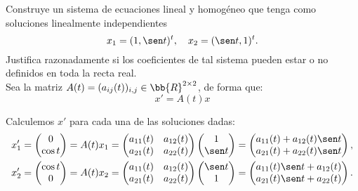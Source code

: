\begin{ejercicio}\label{ej:5.3}
    Construye un sistema de ecuaciones lineal y homogéneo que tenga como soluciones linealmente independientes
    \[
        x_1 = (1, \sen t)^t, \quad x_2 = (\sen t, 1)^t.
    \]
    Justifica razonadamente si los coeficientes de tal sistema pueden estar o no definidos en toda la recta real.\\

    Sea la matriz $A(t)=(a_{ij}(t))_{i,j}\in \bb{R}^{2\times 2}$, de forma que:
    \begin{equation*}
        x' = A(t)x
    \end{equation*}

    Calculemos $x'$ para cada una de las soluciones dadas:
    \begin{align*}
        x_1' &= \begin{pmatrix}
            0\\
            \cos t
        \end{pmatrix}
        = A(t)x_1 = \begin{pmatrix}
            a_{11}(t) & a_{12}(t)\\
            a_{21}(t) & a_{22}(t)
        \end{pmatrix}
        \begin{pmatrix}
            1\\
            \sen t
        \end{pmatrix}
        = \begin{pmatrix}
            a_{11}(t) + a_{12}(t)\sen t\\
            a_{21}(t) + a_{22}(t)\sen t
        \end{pmatrix},\\
        x_2' &= \begin{pmatrix}
            \cos t\\
            0
        \end{pmatrix}
        = A(t)x_2 = \begin{pmatrix}
            a_{11}(t) & a_{12}(t)\\
            a_{21}(t) & a_{22}(t)
        \end{pmatrix}
        \begin{pmatrix}
            \sen t\\
            1
        \end{pmatrix}
        = \begin{pmatrix}
            a_{11}(t)\sen t + a_{12}(t)\\
            a_{21}(t)\sen t + a_{22}(t)
        \end{pmatrix}.
    \end{align*}


\end{ejercicio}
